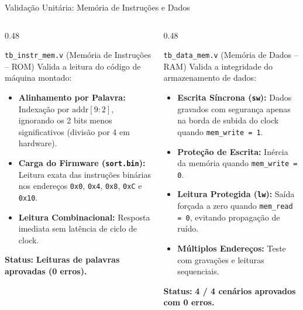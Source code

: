 \documentclass[aspectratio=169, 11pt]{beamer}
\begin{document}
\begin{frame}{Validação Unitária: Memória de Instruções e Dados}
  \begin{columns}[T]
    \begin{column}{0.48\textwidth}
      \begin{block}{\texttt{tb\_instr\_mem.v} (Memória de Instruções -- ROM)}
        \small
        Valida a leitura do código de máquina montado:
        \begin{itemize}\setlength{\itemsep}{5pt}
          \item \textbf{Alinhamento por Palavra:} Indexação por $\text{addr}[9:2]$, ignorando os 2 bits menos significativos (divisão por 4 em hardware).
          \item \textbf{Carga do Firmware (\texttt{sort.bin}):} Leitura exata das instruções binárias nos endereços \texttt{0x0}, \texttt{0x4}, \texttt{0x8}, \texttt{0xC} e \texttt{0x10}.
          \item \textbf{Leitura Combinacional:} Resposta imediata sem latência de ciclo de clock.
        \end{itemize}
        \textbf{Status:} \textcolor{passgreen}{\textbf{Leituras de palavras aprovadas (0 erros).}}
      \end{block}
    \end{column}

    \begin{column}{0.48\textwidth}
      \begin{block}{\texttt{tb\_data\_mem.v} (Memória de Dados -- RAM)}
        \small
        Valida a integridade do armazenamento de dados:
        \begin{itemize}\setlength{\itemsep}{5pt}
          \item \textbf{Escrita Síncrona (\texttt{sw}):} Dados gravados com segurança apenas na borda de subida do clock quando \texttt{mem\_write = 1}.
          \item \textbf{Proteção de Escrita:} Inércia da memória quando \texttt{mem\_write = 0}.
          \item \textbf{Leitura Protegida (\texttt{lw}):} Saída forçada a zero quando \texttt{mem\_read = 0}, evitando propagação de ruído.
          \item \textbf{Múltiplos Endereços:} Teste com gravações e leituras sequenciais.
        \end{itemize}
        \textbf{Status:} \textcolor{passgreen}{\textbf{4 / 4 cenários aprovados com 0 erros.}}
      \end{block}
    \end{column}
  \end{columns}
\end{frame}
\end{document}
